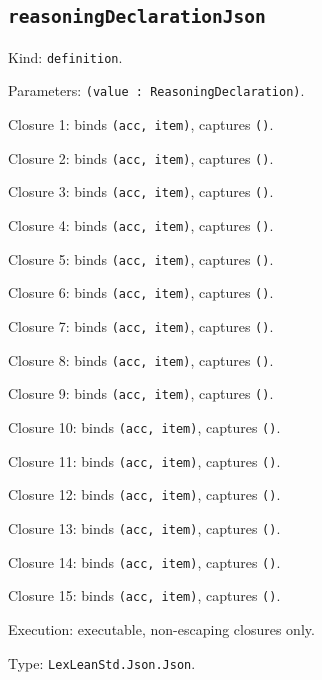 \documentclass[11pt]{article}
\begin{document}
\subsection*{\texttt{reasoningDeclarationJson}}
\noindent Kind: \texttt{definition}.\par
\noindent Parameters: \texttt{(value : ReasoningDeclaration)}.\par
\noindent Closure 1: binds \texttt{(acc, item)}, captures \texttt{()}.\par
\noindent Closure 2: binds \texttt{(acc, item)}, captures \texttt{()}.\par
\noindent Closure 3: binds \texttt{(acc, item)}, captures \texttt{()}.\par
\noindent Closure 4: binds \texttt{(acc, item)}, captures \texttt{()}.\par
\noindent Closure 5: binds \texttt{(acc, item)}, captures \texttt{()}.\par
\noindent Closure 6: binds \texttt{(acc, item)}, captures \texttt{()}.\par
\noindent Closure 7: binds \texttt{(acc, item)}, captures \texttt{()}.\par
\noindent Closure 8: binds \texttt{(acc, item)}, captures \texttt{()}.\par
\noindent Closure 9: binds \texttt{(acc, item)}, captures \texttt{()}.\par
\noindent Closure 10: binds \texttt{(acc, item)}, captures \texttt{()}.\par
\noindent Closure 11: binds \texttt{(acc, item)}, captures \texttt{()}.\par
\noindent Closure 12: binds \texttt{(acc, item)}, captures \texttt{()}.\par
\noindent Closure 13: binds \texttt{(acc, item)}, captures \texttt{()}.\par
\noindent Closure 14: binds \texttt{(acc, item)}, captures \texttt{()}.\par
\noindent Closure 15: binds \texttt{(acc, item)}, captures \texttt{()}.\par
\noindent Execution: executable, non-escaping closures only.\par
\noindent Type: \texttt{LexLeanStd.Json.Json}.\par
\end{document}

